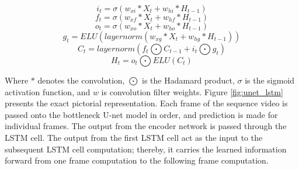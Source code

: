     \begin{equation}
    	i_t = \sigma(w_{xi}*X_t+w_{hi}*H_{t-1})
    	\label{eq:it}
    \end{equation}
    \begin{equation}
		f_t = \sigma(w_{xf}*X_t+w_{hf}*H_{t-1})
		\label{eq:ft}
	\end{equation}    
    \begin{equation}
	 	o_t = \sigma(w_{xo}*X_t+w_{ho}*H_{t-1})
	 	\label{eq:ot}
 	\end{equation}   
    \begin{equation}
	    g_t = ELU(layernorm(w_{xg}*X_t+w_{hg}*H_{t-1}))
	    \label{eq:gt}
    \end{equation}
    \begin{equation}
	    C_t = layernorm(f_t \bigodot C_{t-1} +i_t \bigodot g_t)
	    \label{eq:Ct}
    \end{equation}
    \begin{equation}
	    H_t = o_t \bigodot ELU(C_t)
	    \label{eq:Ht}
    \end{equation}
    
    Where $*$ denotes the convolution, $\bigodot$ is the Hadamard product, $\sigma$ is the sigmoid activation function, and $w$ is convolution filter weights. Figure \ref{fig:unet_lstm} presents the exact pictorial representation. Each frame of the sequence video is passed onto the bottleneck U-net model in order, and prediction is made for individual frames. The output from the encoder network is passed through the LSTM cell. The output from the first LSTM cell act as the input to the subsequent LSTM cell computation; thereby, it carries the learned information forward from one frame computation to the following frame computation.   
    
